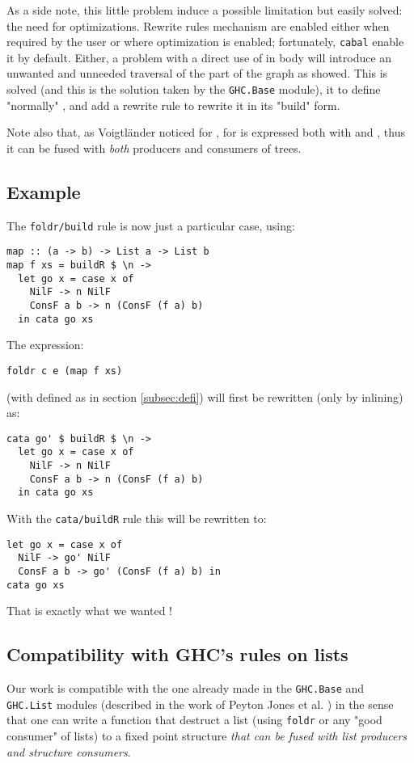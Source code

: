 As a side note, this little problem induce a possible limitation but easily solved: the need for optimizations. Rewrite rules mechanism are enabled either when required by the user or where optimization is enabled; fortunately, \verb|cabal| enable it by default. Either, a problem with a direct use of  in  body will introduce an unwanted and unneeded traversal of the part of the graph as showed. This is solved (and this is the solution taken by the \verb|GHC.Base| module), it to define "normally" , and add a rewrite rule to rewrite it in its "build" form.

Note also that, as Voigtländer \cite{Voigtlnder2008TypesFP} noticed for ,  for  is expressed both with  and , thus it can be fused with \emph{both} producers and consumers of trees.

\subsection{Example}
The \verb|foldr/build| rule is now just a particular case, using:
\begin{verbatim}
map :: (a -> b) -> List a -> List b
map f xs = buildR $ \n ->
  let go x = case x of
    NilF -> n NilF
    ConsF a b -> n (ConsF (f a) b)
  in cata go xs
\end{verbatim}

The expression:
\begin{verbatim}
foldr c e (map f xs)
\end{verbatim}
(with  defined as in section \ref{subsec:defi}) will first be rewritten (only by inlining) as:
\begin{verbatim}
cata go' $ buildR $ \n ->
  let go x = case x of
    NilF -> n NilF
    ConsF a b -> n (ConsF (f a) b)
  in cata go xs
\end{verbatim}

With the \verb|cata/buildR| rule this will be rewritten to:
\begin{verbatim}
let go x = case x of
  NilF -> go' NilF
  ConsF a b -> go' (ConsF (f a) b) in
cata go xs
\end{verbatim}
That is exactly what we wanted !
\subsection{Compatibility with GHC's rules on lists}
Our work is compatible with the one already made in the \verb|GHC.Base| and \verb|GHC.List| modules (described in the work of Peyton Jones et al. \cite{playing-by-the-rules-rewriting-as-a-practical-optimisation-technique-in-ghc} ) in the sense that one can write a function that destruct a list (using \verb|foldr| or any "good consumer" of lists) to a fixed point structure \emph{that can be fused with list producers and structure consumers}.


